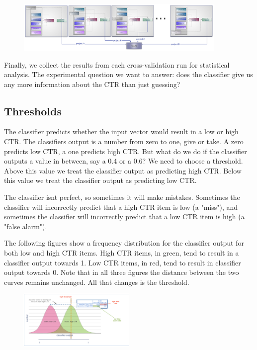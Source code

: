 \begin{figure}
\centering
\includegraphics[width=0.9\textwidth]{img/testclass/2.jpg}
\caption{
}
\label{Fig.1}
\end{figure}

Finally, we collect the results from each cross-validation run for statistical analysis. The experimental question we want to answer: does the classifier give us any more information about the CTR than just guessing?

\subsection*{Thresholds}

The classifier predicts whether the input vector would result in a low or high CTR. The classifier\textsc{}s output is a number from zero to one, give or take. A zero predicts low CTR, a one predicts high CTR. But what do we do if the classifier outputs a value in between, say a 0.4 or a 0.6? We need to choose a threshold. Above this value we treat the classifier output as predicting high CTR. Below this value we treat the classifier output as predicting low CTR.

The classifier isn\textsc{}t perfect, so sometimes it will make mistakes. Sometimes the classifier will incorrectly predict that a high CTR item is low (a "miss"), and sometimes the classifier will incorrectly predict that a low CTR item is high (a "false alarm").

The following figures show a frequency distribution for the classifier output for both low and high CTR items. High CTR items, in green, tend to result in a classifier output towards 1. Low CTR items, in red, tend to result in classifier output towards 0. Note that in all three figures the distance between the two curves remains unchanged. All that changes is the threshold.

\begin{figure}
\centering
\includegraphics[width=0.5\textwidth]{img/testclass/3.png}
\caption{
}
\label{Fig.1}
\end{figure}


